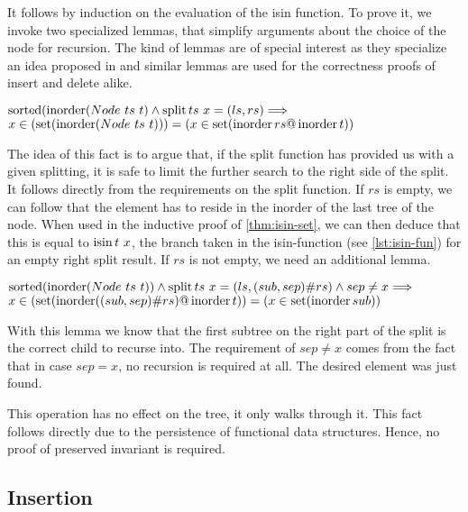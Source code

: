 It follows by induction on the evaluation of the isin function.
To prove it, we invoke two specialized lemmas,
that simplify arguments about the choice of the node for recursion.
The kind of lemmas are of special interest as they specialize
an idea proposed in \parencite{DBLP:conf/itp/Nipkow16} and similar lemmas
are used for the correctness proofs of insert and delete alike.

\begin{lemma}
    $\operatorname{sorted} (\operatorname{inorder} (Node\ ts\ t) \wedge \operatorname{split} ts\ x = (ls, rs) \Longrightarrow$ \\
    $x \in (\operatorname{set} (\operatorname{inorder} (Node\ ts\ t))) = (x \in \operatorname{set} (\operatorname{inorder} rs @ \operatorname{inorder} t))$
\end{lemma}

The idea of this fact is to argue that, if the split function has provided
us with a given splitting, it is safe to limit the further search
to the right side of the split.
It follows directly from the requirements on the split function.
If $rs$ is empty, we can follow that the element has to reside in the inorder
of the last tree of the node.
When used in the inductive proof of \autoref{thm:isin-set}, we can then deduce that this is
equal to $\operatorname{isin} t\ x$, the branch taken in the isin-function (see \autoref{lst:isin-fun}) for an empty right split result.
If $rs$ is not empty, we need an additional lemma.

\begin{lemma}
    $\operatorname{sorted} (\operatorname{inorder} (Node\ ts\ t)) \wedge \operatorname{split} ts\ x = (ls, (sub,sep)\#rs) \wedge sep \neq x \Longrightarrow$ \\
    $x \in (\operatorname{set} (\operatorname{inorder} ((sub,sep)\#rs) @ \operatorname{inorder} t)) = (x \in \operatorname{set} (\operatorname{inorder} sub))$
\end{lemma}

With this lemma we know that the first subtree on the right part of the split
is the correct child to recurse into.
The requirement of $sep \neq x$ comes from the fact that in case $sep = x$,
no recursion is required at all.
The desired element was just found.

This operation has no effect on the tree, it only walks through it.
This fact follows directly due to the persistence of functional data structures.
Hence, no proof of preserved invariant is required.

\subsection{Insertion}

